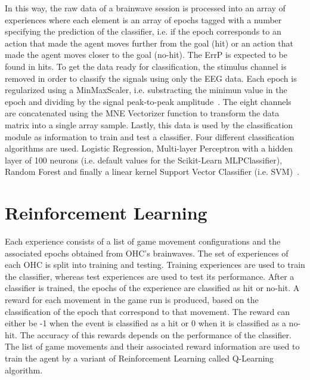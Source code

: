\documentclass[journal]{IEEEtran}
\begin{document}
{In this way, the raw data of a brainwave session is processed into an array of experiences where each element is an array of epochs tagged with a number specifying the prediction of the classifier, i.e. if the epoch corresponds to an action that made the agent moves further from the goal (hit) or an action that made the agent moves closer to the goal (no-hit). The ErrP is expected to be found in hits. To get the data ready for classification, the stimulus channel is removed in order to classify the signals using only the EEG data. Each epoch is regularized using a MinMaxScaler, i.e. substracting the minimun value in the epoch and dividing by the signal peak-to-peak amplitude~\cite{Zhou2019}.  The eight channels are concatenated using the  MNE Vectorizer function to transform the data matrix into a single array sample. Lastly, this data is used by the classification module as information to train and test a classifier. Four different classification algorithms are used.  Logistic Regression, Multi-layer Perceptron with a hidden layer of 100 neurons (i.e. default values for the Scikit-Learn MLPClassifier), Random Forest and finally a linear kernel Support Vector Classifier (i.e. SVM)~\cite{Lotte2018}.  




\section{Reinforcement Learning}
\label{learning}

Each experience consists of a list of game movement configurations and the associated epochs obtained from OHC's brainwaves.  The set of experiences of each OHC is split into training and testing.  Training experiences are used to train the classifier, whereas test experiences are used to test its performance.  After a classifier is trained, the epochs of the experience are classified as hit or no-hit.  A reward for each movement in the game run is produced, based on the classification of the epoch that correspond to that movement.  The reward can either be -1 when the event is classified as a hit or 0 when it is classified as a no-hit. The accuracy of this rewards depends on the performance of the classifier. The list of game movements and their associated reward information are used to train the agent by a variant of Reinforcement Learning called Q-Learning algorithm.

}
\end{document}

